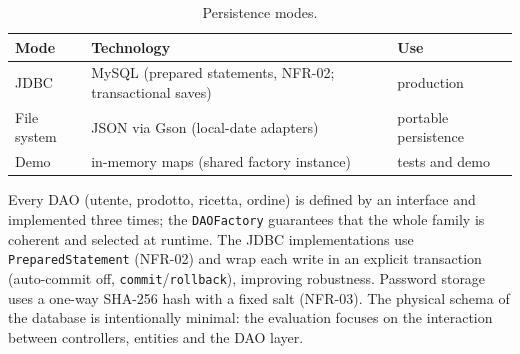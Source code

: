 \begin{table}[H]
\centering
\caption{Persistence modes.}
\label{tab:persistence}
\begin{tabular}{@{}lll@{}}
\toprule
\textbf{Mode} & \textbf{Technology} & \textbf{Use} \\
\midrule
JDBC & MySQL (prepared statements, NFR-02; transactional saves) & production \\
File system & JSON via Gson (local-date adapters) & portable persistence \\
Demo & in-memory maps (shared factory instance) & tests and demo \\
\bottomrule
\end{tabular}
\end{table}

Every DAO (utente, prodotto, ricetta, ordine) is defined by an interface and
implemented three times; the \texttt{DAOFactory} guarantees that the whole
family is coherent and selected at runtime. The JDBC implementations use
\texttt{PreparedStatement} (NFR-02) and wrap each write in an explicit
transaction (auto-commit off, \texttt{commit}/\texttt{rollback}), improving
robustness. Password storage uses a one-way SHA-256 hash with a fixed salt
(NFR-03). The physical schema of the database is intentionally minimal: the
evaluation focuses on the interaction between controllers, entities and the
DAO layer.